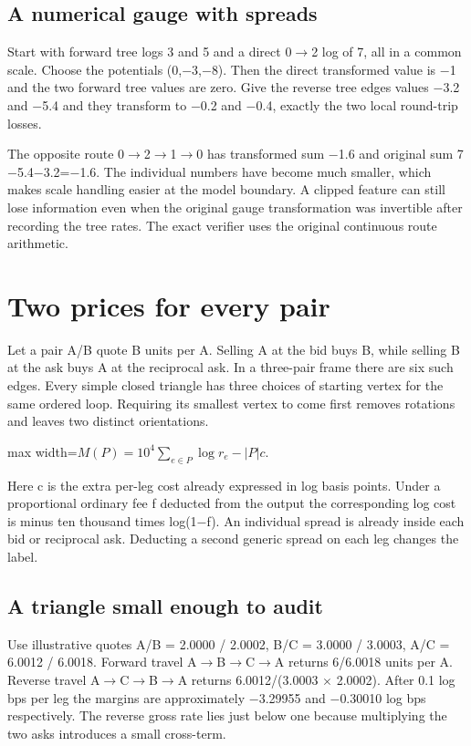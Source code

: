 \documentclass[11pt,oneside,openany]{book}
\begin{document}
\section*{A numerical gauge with spreads}
Start with forward tree logs 3 and 5 and a direct 0\ensuremath{\to}2 log of 7, all in a common scale. Choose the potentials (0,\ensuremath{-}3,\ensuremath{-}8). Then the direct transformed value is \ensuremath{-}1 and the two forward tree values are zero. Give the reverse tree edges values \ensuremath{-}3.2 and \ensuremath{-}5.4 and they transform to \ensuremath{-}0.2 and \ensuremath{-}0.4, exactly the two local round-trip losses.

The opposite route 0\ensuremath{\to}2\ensuremath{\to}1\ensuremath{\to}0 has transformed sum \ensuremath{-}1.6 and original sum 7\ensuremath{-}5.4\ensuremath{-}3.2=\ensuremath{-}1.6. The individual numbers have become much smaller, which makes scale handling easier at the model boundary. A clipped feature can still lose information even when the original gauge transformation was invertible after recording the tree rates. The exact verifier uses the original continuous route arithmetic.

\chapter{Two prices for every pair}
Let a pair A/B quote B units per A. Selling A at the bid buys B, while selling B at the ask buys A at the reciprocal ask. In a three-pair frame there are six such edges. Every simple closed triangle has three choices of starting vertex for the same ordered loop. Requiring its smallest vertex to come first removes rotations and leaves two distinct orientations.

\begin{center}\begin{adjustbox}{max width=\linewidth}$\displaystyle M(P)=10^4\sum_{e\in P}\log r_e-|P|c.$\end{adjustbox}\end{center}
Here c is the extra per-leg cost already expressed in log basis points. Under a proportional ordinary fee f deducted from the output the corresponding log cost is minus ten thousand times log(1\ensuremath{-}f). An individual spread is already inside each bid or reciprocal ask. Deducting a second generic spread on each leg changes the label.

\section*{A triangle small enough to audit}
Use illustrative quotes A/B = 2.0000 / 2.0002, B/C = 3.0000 / 3.0003, A/C = 6.0012 / 6.0018. Forward travel A\ensuremath{\to}B\ensuremath{\to}C\ensuremath{\to}A returns 6/6.0018 units per A. Reverse travel A\ensuremath{\to}C\ensuremath{\to}B\ensuremath{\to}A returns 6.0012/(3.0003 \ensuremath{\times} 2.0002). After 0.1 log bps per leg the margins are approximately \ensuremath{-}3.29955 and \ensuremath{-}0.30010 log bps respectively. The reverse gross rate lies just below one because multiplying the two asks introduces a small cross-term.
\end{document}
